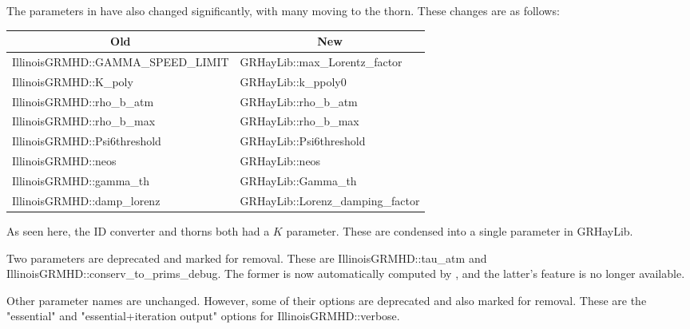 \documentclass{article}
\begin{document}
The parameters in \igm{} have also changed significantly, with many
moving to the \glib{} thorn. These changes are as follows:
%
\begin{center}
\begin{tabular}{|l l|}
 \multicolumn{1}{|c}{Old} & \multicolumn{1}{c|}{New} \\\hline
 IllinoisGRMHD::GAMMA\_SPEED\_LIMIT & GRHayLib::max\_Lorentz\_factor \\
 IllinoisGRMHD::K\_poly             & GRHayLib::k\_ppoly0 \\
 IllinoisGRMHD::rho\_b\_atm         & GRHayLib::rho\_b\_atm \\
 IllinoisGRMHD::rho\_b\_max         & GRHayLib::rho\_b\_max \\
 IllinoisGRMHD::Psi6threshold       & GRHayLib::Psi6threshold \\
 IllinoisGRMHD::neos                & GRHayLib::neos \\
 IllinoisGRMHD::gamma\_th           & GRHayLib::Gamma\_th \\
 IllinoisGRMHD::damp\_lorenz        & GRHayLib::Lorenz\_damping\_factor \\\hline
\end{tabular}
\end{center}
%
As seen here, the ID converter and \igm{} thorns both had a $K$ parameter.
These are condensed into a single parameter in GRHayLib.

Two parameters are deprecated and marked for removal. These are
IllinoisGRMHD::tau\_atm and IllinoisGRMHD::conserv\_to\_prims\_debug. The former
is now automatically computed by \glib, and the latter's feature is no
longer available.

Other \igm{} parameter names are unchanged. However, some of their options
are deprecated and also marked for removal. These are the "essential" and
"essential+iteration output" options for IllinoisGRMHD::verbose.
\end{document}
